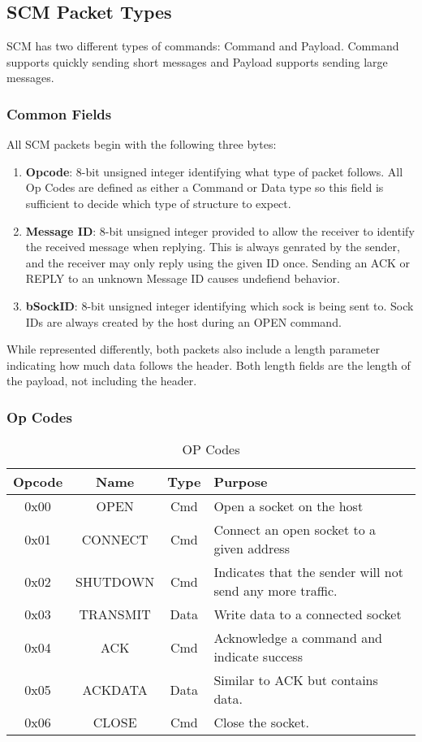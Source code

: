 \documentclass[10pt]{article}
\begin{document}
	\subsection{SCM Packet Types}
	SCM has two different types of commands: Command and Payload. Command supports quickly sending short messages and Payload supports sending large messages.
	\subsubsection{Common Fields}
	All SCM packets begin with the following three bytes:\\
	\begin{enumerate}
		\item \textbf{Opcode}: 8-bit unsigned integer identifying what type of packet follows. All Op Codes are defined as either a Command or Data type so this field is sufficient to decide which type of structure to expect.
		\item \textbf{Message ID}: 8-bit unsigned integer provided to allow the receiver to identify the received message when replying. This is always genrated by the sender, and the receiver may only reply using the given ID once. Sending an ACK or REPLY to an unknown Message ID causes undefiend behavior.
		\item \textbf{bSockID}: 8-bit unsigned integer identifying which sock is being sent to. Sock IDs are always created by the host during an OPEN command.
	\end{enumerate}
	While represented differently, both packets also include a length parameter indicating how much data follows the header. Both length fields are the length of the payload, not including the header. 
	
	\subsubsection{Op Codes}
	\begin{table}[h!]
		\begin{center}
			\caption{OP Codes}
			\label{tab:table1}
			\begin{tabular}{c|c|c|l} 
				\rowcolor{lightgray}
				\textbf{Opcode} &	\textbf{Name} &	\textbf{Type} & \textbf{Purpose}\\
				\hline
				0x00 & OPEN & Cmd & Open a socket on the host\\
				0x01 & CONNECT & Cmd & Connect an open socket to a given address\\
				0x02 & SHUTDOWN & Cmd & Indicates that the sender will not send any more traffic.\\
				0x03 & TRANSMIT & Data & Write data to a connected socket\\
				0x04 & ACK	& Cmd & Acknowledge a command and indicate success\\
				0x05 & ACKDATA	& Data & Similar to ACK but contains data. \\
				0x06 & CLOSE	& Cmd & Close the socket. \\
			\end{tabular}
		\end{center}
	\end{table}
\end{document}
